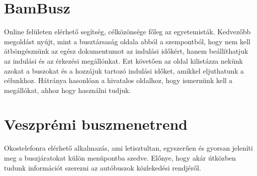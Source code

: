 \section*{BamBusz}
\label{bambusz}

Online felületen elérhető segítség, célközönsége főleg az egyetemisták. 
Kedvezőbb megoldást nyújt, mint a busztársaság oldala abból a szempontból, hogy nem kell átböngésznünk az egész dokumentumot az indulási időkért, hanem beállíthatjuk az indulási és az érkezési megállónkat. 
Ezt követően az oldal kilistázza nekünk azokat a buszokat és a hozzájuk tartozó indulási időket, amikkel eljuthatunk a célunkhoz. 
Hátránya hasonlóan a hivatalos oldalhoz, hogy ismernünk kell a megállókat, ahhoz hogy használni tudjuk. 

\section*{Veszprémi buszmenetrend}
\label{veszprbuszmen}

Okostelefonra elérhető alkalmazás, ami letisztultan, egyszerűen és gyorsan jeleníti meg a buszjáratokat külön menüpontba szedve. 
Előnye, hogy akár útközben tudunk információt szerezni az autóbuszok közlekedési rendjéről. 

\newpage







